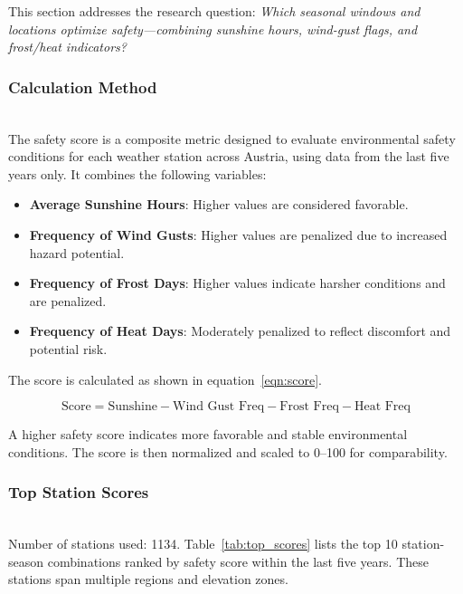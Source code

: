 This section addresses the research question: \textit{Which seasonal windows and locations optimize safety—combining sunshine hours, wind-gust flags, and frost/heat indicators?}

\subsubsection{Calculation Method}\leavevmode \\
The safety score is a composite metric designed to evaluate environmental
safety conditions for each weather station across Austria, using data from the
last five years only. It combines the following variables:

\begin{itemize}
    \item \textbf{Average Sunshine Hours}: Higher values are considered favorable.
    \item \textbf{Frequency of Wind Gusts}: Higher values are penalized due to increased hazard potential.
    \item \textbf{Frequency of Frost Days}: Higher values indicate harsher conditions and are penalized.
    \item \textbf{Frequency of Heat Days}: Moderately penalized to reflect discomfort and potential risk.
\end{itemize}

\noindent The score is calculated as shown in equation~\ref{eqn:score}.

\begin{equation}
    \text{Score} = \text{Sunshine} - \text{Wind Gust Freq} - \text{Frost Freq} - \text{Heat Freq}
\label{eqn:score}
\end{equation}

\noindent A higher safety score indicates more favorable and stable environmental
conditions. The score is then normalized and scaled to 0–100 for comparability.

\subsubsection{Top Station Scores}\leavevmode \\
Number of stations used: 1134.
\noindent Table~\ref{tab:top_scores} lists the top 10 station-season combinations ranked by safety score within the last five years. These stations span multiple regions and elevation zones.

